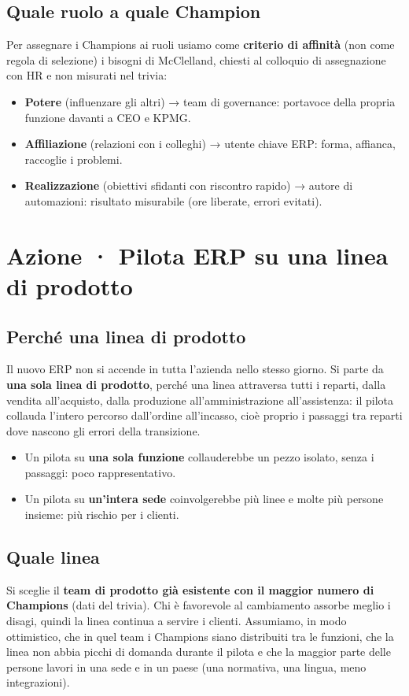 \documentclass[11pt,a4paper]{article}
\begin{document}
\subsection{Quale ruolo a quale Champion}\label{sec:8.4}
Per assegnare i Champions ai ruoli usiamo come \textbf{criterio di affinità} (non come regola di selezione) i bisogni di McClelland, chiesti al colloquio di assegnazione con HR e non misurati nel trivia:
\begin{itemize}
\item \textbf{Potere} (influenzare gli altri) → team di governance: portavoce della propria funzione davanti a CEO e KPMG.
\item \textbf{Affiliazione} (relazioni con i colleghi) → utente chiave ERP: forma, affianca, raccoglie i problemi.
\item \textbf{Realizzazione} (obiettivi sfidanti con riscontro rapido) → autore di automazioni: risultato misurabile (ore liberate, errori evitati).
\end{itemize}

\section{Azione · Pilota ERP su una linea di prodotto}\label{sec:9}

\subsection{Perché una linea di prodotto}\label{sec:9.1}
Il nuovo ERP non si accende in tutta l'azienda nello stesso giorno. Si parte da \textbf{una sola linea di prodotto}, perché una linea attraversa tutti i reparti, dalla vendita all'acquisto, dalla produzione all'amministrazione all'assistenza: il pilota collauda l'intero percorso dall'ordine all'incasso, cioè proprio i passaggi tra reparti dove nascono gli errori della transizione.
\begin{itemize}
\item Un pilota su \textbf{una sola funzione} collauderebbe un pezzo isolato, senza i passaggi: poco rappresentativo.
\item Un pilota su \textbf{un'intera sede} coinvolgerebbe più linee e molte più persone insieme: più rischio per i clienti.
\end{itemize}

\subsection{Quale linea}\label{sec:9.2}
Si sceglie il \textbf{team di prodotto già esistente con il maggior numero di Champions} (dati del trivia). Chi è favorevole al cambiamento assorbe meglio i disagi, quindi la linea continua a servire i clienti. Assumiamo, in modo ottimistico, che in quel team i Champions siano distribuiti tra le funzioni, che la linea non abbia picchi di domanda durante il pilota e che la maggior parte delle persone lavori in una sede e in un paese (una normativa, una lingua, meno integrazioni).
\end{document}

